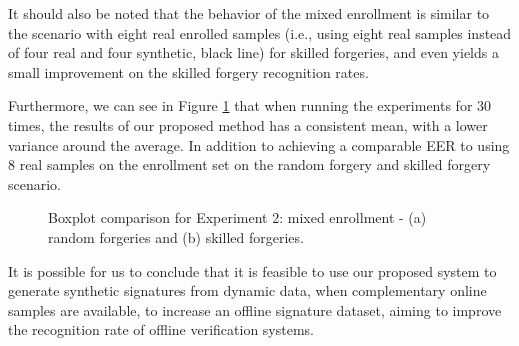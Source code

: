 It should also be noted that the behavior of the mixed enrollment is similar to the scenario with eight real enrolled samples (i.e., using eight real samples instead of
four real and four synthetic, black line) for skilled forgeries, and even yields a small improvement on the skilled forgery recognition rates. 

Furthermore, we can see in Figure \ref{fig:boxexp2} that when running the experiments for 30 times, the results of our proposed method has a consistent mean, with
a lower variance around the average. In addition to achieving a comparable EER to using 8 real samples on the enrollment set on the random forgery and skilled forgery scenario.

\begin{figure}[!htb]
\centering
\hspace*{0.8in} %
\caption{Boxplot comparison for Experiment 2: mixed enrollment - (a) random forgeries and (b) skilled forgeries. } \label{fig:boxexp2}
\end{figure}

It is possible for us to conclude that it is feasible to use our proposed system to generate synthetic signatures from dynamic data, when complementary online samples are available, to increase an offline signature dataset, aiming to improve the recognition rate of offline verification systems.




